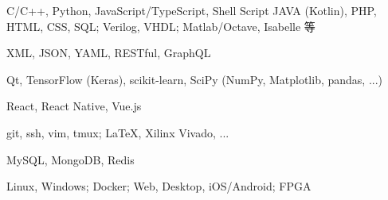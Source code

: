 
\begin{cvtbl}

        {C/C++, Python, JavaScript/TypeScript, Shell Script}
        {JAVA (Kotlin), PHP, HTML, CSS, SQL; Verilog, VHDL; Matlab/Octave, Isabelle 等}

        {XML, JSON, YAML, RESTful, GraphQL}

        {Qt, TensorFlow (Keras), scikit-learn, SciPy (NumPy, Matplotlib, pandas, ...)}

        {React, React Native, Vue.js}

        {git, ssh, vim, tmux; \LaTeX, Xilinx Vivado, ...}

        {MySQL, MongoDB, Redis}

        {Linux, Windows; Docker; Web, Desktop, iOS/Android; FPGA}
\end{cvtbl}

\endinput